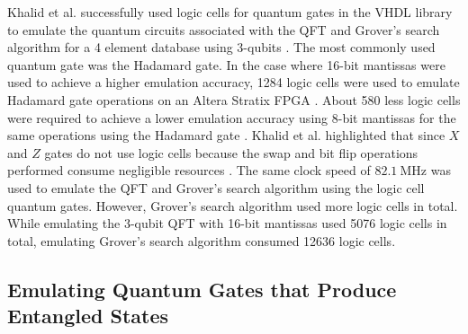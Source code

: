 Khalid et al. successfully used logic cells for quantum gates in the VHDL library to emulate the quantum circuits associated with the QFT and Grover's search algorithm for a 4 element database using 3-qubits \cite{Khalid2004}. The most commonly used quantum gate was the Hadamard gate. In the case where 16-bit mantissas were used to achieve a higher emulation accuracy, 1284 logic cells were used to emulate Hadamard gate operations on an Altera Stratix FPGA \cite{Khalid2004}. About 580 less logic cells were required to achieve a lower emulation accuracy using 8-bit mantissas for the same operations using the Hadamard gate \cite{Khalid2004}. Khalid et al. highlighted that since $X$ and $Z$ gates do not use logic cells because the swap and bit flip operations performed consume negligible resources \cite{Khalid2004}. The same clock speed of $\SI{82.1}{\mega\hertz}$ was used to emulate the QFT and Grover's search algorithm using the logic cell quantum gates. However, Grover's search algorithm used more logic cells in total. While emulating the 3-qubit QFT with 16-bit mantissas used 5076 logic cells in total, emulating Grover's search algorithm consumed 12636 logic cells. 

\subsection{Emulating Quantum Gates that Produce Entangled States}

